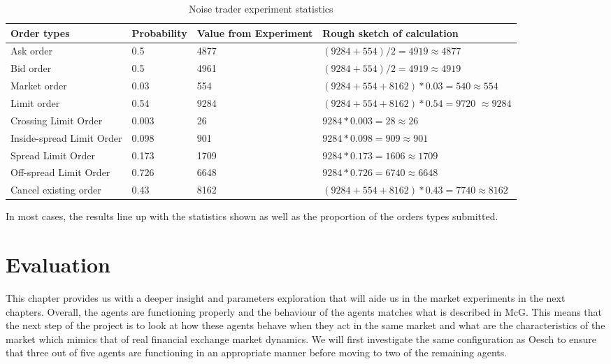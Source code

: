 \begin{table}[h]
\centering
\begin{tabular}{ |l||l|p{2cm}|p{6cm}|} 
\hline
\textbf{Order types} & \textbf{Probability} & \textbf{Value from Experiment} & \textbf{Rough sketch of calculation} \\
\hline
\hline
Ask order & 0.5 & 4877 & $(9284 + 554) / 2 = 4919 \approx 4877$\\ 
\hline
Bid order & 0.5 & 4961 & $(9284 + 554) / 2 = 4919 \approx 4919$\\ 
\hline
\hline
Market order & 0.03 & 554 & $(9284 + 554 + 8162) * 0.03 = 540 \approx 554$\\ 
\hline
\hline
Limit order & 0.54 & 9284 & $(9284 + 554 + 8162) * 0.54 = 9720$  
\newline $\approx 9284 $\\ 
\hline
Crossing Limit Order & 0.003 & 26 & $9284 * 0.003 = 28 \approx 26 $\\ 
\hline
Inside-spread Limit Order & 0.098 & 901 & $9284 * 0.098 = 909 \approx 901 $\\ 
\hline
Spread Limit Order & 0.173 & 1709 & $9284 * 0.173 = 1606 \approx 1709 $\\ 
\hline
Off-spread Limit Order & 0.726 & 6648 & $9284 * 0.726 = 6740 \approx 6648 $\\ 
\hline
\hline
Cancel existing order & 0.43 & 8162 & $(9284 + 554 + 8162) * 0.43 = 7740  \approx 8162 $\\ 
\hline
\end{tabular}
\caption{Noise trader experiment statistics} 
\end{table}
\FloatBarrier 

In most cases, the results line up with the statistics shown as well as the proportion of the orders types submitted.

\section{Evaluation}
This chapter provides us with a deeper insight and parameters exploration that will aide us in the market experiments in the next chapters. Overall, the agents are functioning properly and the behaviour of the agents matches what is described in McG. This means that the next step of the project is to look at how these agents behave when they act in the same market and what are the characteristics of the market which mimics that of real financial exchange market dynamics. We will first investigate the same configuration as Oesch to ensure that three out of five agents are functioning in an appropriate manner before moving to two of the remaining agents. 